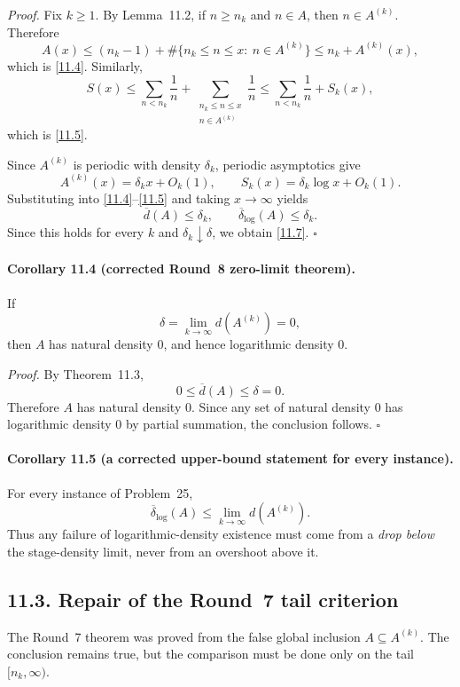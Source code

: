 \emph{Proof.}
Fix $k\ge 1$.  By Lemma~11.2, if $n\ge n_k$ and $n\in A$, then $n\in A^{(k)}$.  Therefore
\[
A(x)
\le
(n_k-1)+\#\{n_k\le n\le x:\ n\in A^{(k)}\}
\le n_k+A^{(k)}(x),
\]
which is \eqref{11.4}.  Similarly,
\[
S(x)
\le
\sum_{n<n_k}\frac1n
+
\sum_{\substack{n_k\le n\le x\\ n\in A^{(k)}}}\frac1n
\le
\sum_{n<n_k}\frac1n+S_k(x),
\]
which is \eqref{11.5}.

Since $A^{(k)}$ is periodic with density $\delta_k$, periodic asymptotics give
\[
A^{(k)}(x)=\delta_k x+O_k(1),
\qquad
S_k(x)=\delta_k\log x+O_k(1).
\]
Substituting into \eqref{11.4}--\eqref{11.5} and taking $x\to\infty$ yields
\[
\overline d(A)\le \delta_k,
\qquad
\overline\delta_{\log}(A)\le \delta_k.
\]
Since this holds for every $k$ and $\delta_k\downarrow \delta$, we obtain \eqref{11.7}. \hfill $\square$

\paragraph{Corollary 11.4 (corrected Round~8 zero-limit theorem).}
If
\begin{equation}
\delta=\lim_{k\to\infty} d(A^{(k)})=0,
\tag{11.8}
\end{equation}
then $A$ has natural density $0$, and hence logarithmic density $0$.

\emph{Proof.}
By Theorem~11.3,
\[
0\le \overline d(A)\le \delta=0.
\]
Therefore $A$ has natural density $0$.  Since any set of natural density $0$ has logarithmic density $0$ by partial summation, the conclusion follows. \hfill $\square$

\paragraph{Corollary 11.5 (a corrected upper-bound statement for every instance).}
For every instance of Problem~25,
\begin{equation}
\overline\delta_{\log}(A)\le \lim_{k\to\infty} d(A^{(k)}).
\tag{11.9}
\end{equation}
Thus any failure of logarithmic-density existence must come from a \emph{drop below} the stage-density limit, never from an overshoot above it.

\subsection*{11.3. Repair of the Round~7 tail criterion}
The Round~7 theorem was proved from the false global inclusion $A\subseteq A^{(k)}$.  The conclusion remains true, but the comparison must be done only on the tail $[n_k,\infty)$.

